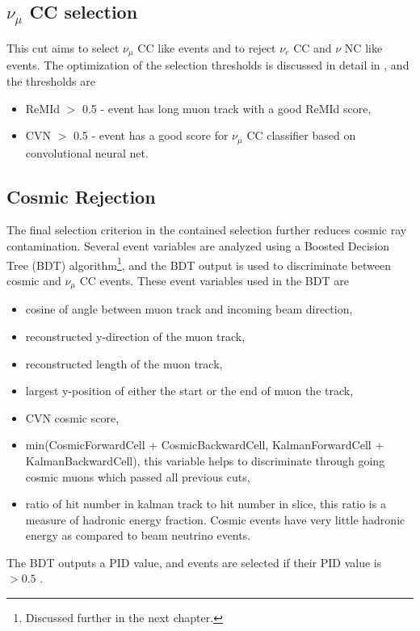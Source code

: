 \subsection{$\nu_\mu$ CC selection} \label{CCSel}
This cut aims to select $\nu_\mu$ CC like events and to reject $\nu_e$ CC and $\nu$ NC like events.
The optimization of the selection thresholds is discussed in detail in \cite{numupid_technote}, 
and the thresholds are
\begin{itemize}
\item ReMId $>$ 0.5 - event has long muon track with a good ReMId score,
\item CVN $>$ 0.5 - event has a good score for $\nu_\mu$ CC classifier based on convolutional neural net.
\end{itemize}

\subsection{Cosmic Rejection}
The final selection criterion in the contained selection further reduces cosmic ray contamination.
Several event variables are analyzed using a Boosted Decision Tree (BDT) algorithm\footnote{Discussed 
further in the next chapter.}\cite{cosrej_technote}, and the BDT output is used to discriminate between 
cosmic and $\nu_\mu$ CC events. These event variables used in the BDT are
\begin{itemize}
\item cosine of angle between muon track and incoming beam direction,
\item reconstructed y-direction of the muon track,
\item reconstructed length of the muon track,
\item largest y-position of either the start or the end of muon the track,
\item CVN cosmic score,
\item min(CosmicForwardCell + CosmicBackwardCell, KalmanForwardCell + KalmanBackwardCell), this 
variable helps to discriminate through going cosmic muons which passed all previous cuts,
\item ratio of hit number in kalman track to hit number in slice, this ratio is a measure of hadronic
energy fraction. Cosmic events have very little hadronic energy as compared to beam neutrino events. 
\end{itemize}
The BDT outputs a PID value, and events are selected if their PID value is $> 0.5$ \cite{numupid_technote}.

